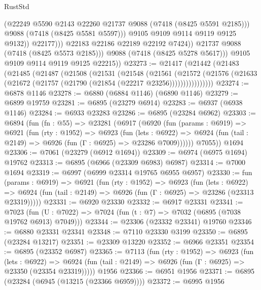 \begin{lexlean}{RustStd}
\begin{coremodule}
                            (@22249 @5590 @2143 @22260 @21737 @9088 (@7418 (@8425 @5591 @2185)))
                            @9088
                            (@7418 (@8425 @5581 @5597)))
                          @9105
                          @9109
                          @9114
                          @9119
                          @9125
                          @9132))
                      @22177)))
                @22183
                @22186
                @22189
                @22192
                @7424))
            @21737
            @9088
            (@7418 (@8425 @5573 @2185)))
          @9088
          (@7418 (@8425 @5278 @5617)))
        @9105
        @9109
        @9114
        @9119
        @9125
        @22215))
@23273 := @21417
    (@21442
      (@21483
        (@21485
          (@21487
            (@21508
              (@21531
                (@21548
                  (@21561
                    (@21572
                      (@21576 (@21633 (@21672 (@21757 (@21790 (@21854 (@22217 @23256))))))))))))))))
@23274 := @6878 @1146
@23278 := @6880 (@6884 @1146) (@6890 @1146)
@23279 := @6899 @19759
@23281 := @6895 (@23279 @6914)
@23283 := @6937 (@6938 @1146)
@23284 := @6933 @23283
@23286 := @6895 (@23284 @6962)
@23303 := @6894
    (fun (fn : @55) =>
    @23281
      (@6917
        (@6920
          (fun (params : @6919) =>
          @6921
            (fun (rty : @1952) =>
            @6923
              (fun (lets : @6922) =>
              @6924 (fun (tail : @2149) => @6926 (fun (Γ : @6925) => @23286 @7009))))))
        @7055))
    @1694
@23306 := @7061 (@23279 (@6912 @1694))
@23309 := @6974 (@6975 @1694) @19762
@23313 := @6895 (@6966 (@23309 @6983) @6987)
@23314 := @7000 @1694
@23319 := @6997 (@6999 @23314 @19765 @6955 @6957)
@23330 := fun (params : @6919) =>
  @6921
    (fun (rty : @1952) =>
    @6923
      (fun (lets : @6922) =>
      @6924 (fun (tail : @2149) => @6926 (fun (Γ : @6925) => @23286 (@23313 @23319)))))
@23331 := @6920 @23330
@23332 := @6917 @23331
@23341 := @7023
    (fun (U : @7022) => @7024 (fun (t : @7) => @7032 (@6895 (@7038 @19762 @6913) @7049)))
@23344 := @23306 (@23332 @23341) @19760
@23346 := @6880 @23331 @23341
@23348 := @7110 @23330 @3199
@23350 := @6895 (@23284 @13217)
@23351 := @23309 @13220
@23352 := @6966 @23351
@23354 := @6895 (@23352 @6987)
@23365 := @7113
    (fun (rty : @1952) =>
    @6923
      (fun (lets : @6922) =>
      @6924 (fun (tail : @2149) => @6926 (fun (Γ : @6925) => @23350 (@23354 @23319)))))
    @1956
@23366 := @6951 @1956
@23371 := @6895 (@23284 (@6945 (@13215 (@23366 @6959))))
@23372 := @6995 @1956

\end{coremodule}
\end{lexlean}
